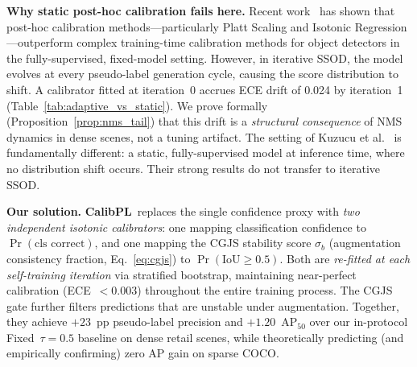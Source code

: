 \documentclass[10pt,twocolumn,letterpaper]{article}
\newcommand{\method}{\textbf{CalibPL}\xspace}
\newcommand{\coco}{\textsc{COCO}\xspace}
\begin{document}
\textbf{Why static post-hoc calibration fails here.}
Recent work~\cite{kuzucu2024calibration} has shown that post-hoc calibration
methods---particularly Platt Scaling and Isotonic Regression---outperform
complex training-time calibration methods for object detectors in the
fully-supervised, fixed-model setting. However, in iterative SSOD, the model
evolves at every pseudo-label generation cycle, causing the score distribution
to shift. A calibrator fitted at iteration~0 accrues ECE drift of 0.024 by
iteration~1 (Table~\ref{tab:adaptive_vs_static}). We prove formally
(Proposition~\ref{prop:nms_tail}) that this drift is a
\emph{structural consequence} of NMS dynamics in dense scenes, not a tuning
artifact. The setting of Kuzucu et al.~\cite{kuzucu2024calibration} is
fundamentally different: a static, fully-supervised model at inference time,
where no distribution shift occurs. Their strong results do not transfer to
iterative SSOD.

\textbf{Our solution.}
\method\ replaces the single confidence proxy with \emph{two independent
isotonic calibrators}: one mapping classification confidence to
$\Pr(\text{cls~correct})$, and one mapping the CGJS stability score $\sigma_b$
(augmentation consistency fraction, Eq.~\ref{eq:cgjs}) to
$\Pr(\text{IoU}{\ge}0.5)$. Both are \emph{re-fitted at each self-training
iteration} via stratified bootstrap, maintaining near-perfect calibration
(ECE~${<}0.003$) throughout the entire training process. The CGJS gate
further filters predictions that are unstable under augmentation. Together, they achieve $+23$~pp pseudo-label
precision and $+1.20$~AP$_{50}$ over our in-protocol Fixed~$\tau{=}0.5$
baseline on dense retail scenes, while theoretically predicting (and
empirically confirming) zero AP gain on sparse \coco.
\end{document}
